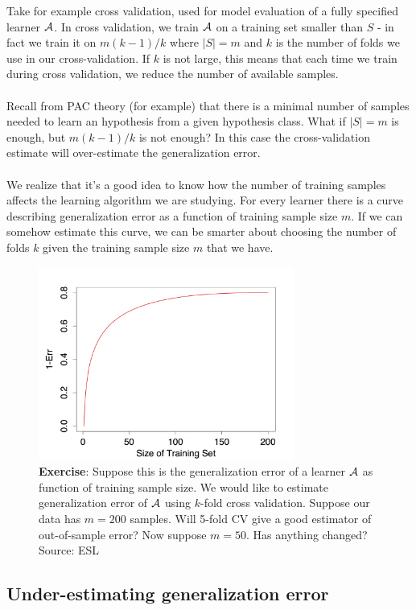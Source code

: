Take for example cross validation, used for model evaluation of a fully
specified learner $\mathcal{A}$. In cross validation, we train $\mathcal{A}$ on a training set
smaller than $S$ - in fact we train it on $m(k-1)/k$ where $|S|=m$ and $k$ is
the number of folds we use in our cross-validation. If $k$ is not large, this
means that each time we train during cross validation, we reduce the number of
available samples. 
\\~\\
Recall from PAC theory (for example) that there is a minimal number of samples
needed to learn an hypothesis from a given hypothesis class. What if $|S|=m$ is
enough, but $m(k-1)/k$ is not enough? In this case the cross-validation estimate
will over-estimate the generalization error. 
\\~\\
We realize that it's a good idea to know how the number of training samples
affects the learning algorithm we are studying. For every learner there is
a curve describing generalization error as a function of training sample size
$m$. If we can somehow estimate this curve, we can be smarter about choosing the
number of folds $k$ given the training sample size $m$ that we have.
      
\begin{figure}[H]
  \centering
  \includegraphics[width=3.3in]{learning_curve.jpeg}  
  \caption{{\bf Exercise}: Suppose this is the generalization error of a learner
    $\mathcal{A}$ as function of training sample size. We would like to estimate
    generalization error of $\mathcal{A}$ using $k$-fold cross validation. 
    Suppose our data has $m=200$ samples.  Will 5-fold CV give a good estimator
of out-of-sample error? Now
suppose $m=50$. Has anything changed? Source: ESL }
\end{figure}



\subsection{Under-estimating generalization error}

